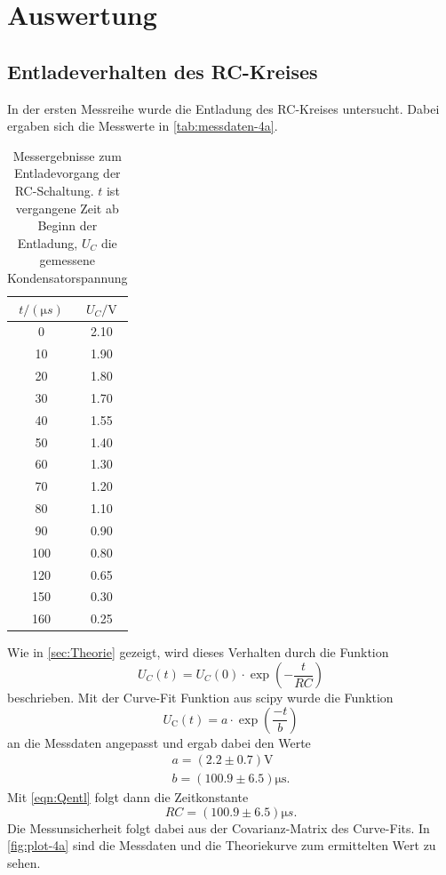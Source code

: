 \section{Auswertung}
\label{sec:Auswertung}

\subsection{Entladeverhalten des RC-Kreises}
\label{sec:4a-auswertung}

In der ersten Messreihe wurde die Entladung des RC-Kreises untersucht. Dabei ergaben sich
die Messwerte in \autoref{tab:messdaten-4a}.

\begin{table}
	\centering
	\caption{Messergebnisse zum Entladevorgang der RC-Schaltung. $t$ ist vergangene Zeit 
	ab Beginn der Entladung, $U_C$ die gemessene Kondensatorspannung}
	\label{tab:messdaten-4a}
	\begin{tabular}{c c}
		\toprule
		$t / (\si{\micro s})$ & $U_C / \si{\volt}$ \\
		\midrule
		0  	&2.10 \\
		10  	&1.90 \\
		20  	&1.80 \\
		30  	&1.70 \\
		40  	&1.55 \\
		50  	&1.40 \\
		60  	&1.30 \\
		70  	&1.20 \\
		80  	&1.10 \\
		90  	&0.90 \\
		100  	&0.80 \\
		120  	&0.65 \\
		150  	&0.30 \\
		160  	&0.25 \\
		\bottomrule
	\end{tabular}
\end{table}

Wie in \autoref{sec:Theorie} gezeigt, wird dieses Verhalten durch die Funktion
\begin{equation}
	U_C(t) = U_C(0) \cdot \exp\left(-\frac{t}{RC}\right)
\end{equation}
beschrieben.
Mit der Curve-Fit Funktion aus scipy wurde die Funktion
\begin{equation}
	U_\text{C}(t) = a \cdot \exp\left(\frac{-t}{b}\right)
\end{equation}
an die Messdaten angepasst und ergab dabei den Werte
\begin{align}
	a = (2.2 \pm 0.7) \si{\volt} \label{eqn:result4a-1} \\
	b = (100.9 \pm 6.5) \si{\micro\second}. \label{eqn:result4a-2}
\end{align}
Mit \autoref{eqn:Qentl} folgt dann die Zeitkonstante
\begin{equation}
	RC = (100.9 \pm 6.5) \si{\micro s}.
	\label{eqn:ergebnis-4a}
\end{equation}
Die Messunsicherheit folgt dabei aus der Covarianz-Matrix des Curve-Fits.
In \autoref{fig:plot-4a} sind die Messdaten und die Theoriekurve zum ermittelten Wert zu sehen.

